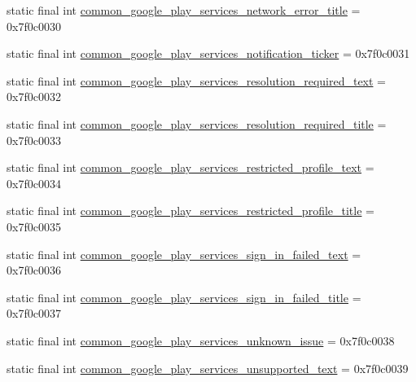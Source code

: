 \begin{DoxyCompactItemize}
static final int \mbox{\hyperlink{classcom_1_1google_1_1android_1_1gms_1_1R_1_1string_ae85e7451ff6dc49eb8c26d8fdca27ad6}{common\+\_\+google\+\_\+play\+\_\+services\+\_\+network\+\_\+error\+\_\+title}} = 0x7f0c0030
\item 
static final int \mbox{\hyperlink{classcom_1_1google_1_1android_1_1gms_1_1R_1_1string_a0ba938c0095c4d531fa326f3faf5dd84}{common\+\_\+google\+\_\+play\+\_\+services\+\_\+notification\+\_\+ticker}} = 0x7f0c0031
\item 
static final int \mbox{\hyperlink{classcom_1_1google_1_1android_1_1gms_1_1R_1_1string_a9a4d1c7d3a7d8f3f8477bdf1aff9f776}{common\+\_\+google\+\_\+play\+\_\+services\+\_\+resolution\+\_\+required\+\_\+text}} = 0x7f0c0032
\item 
static final int \mbox{\hyperlink{classcom_1_1google_1_1android_1_1gms_1_1R_1_1string_aa5b56a3886525cd5cef3815b8a86c771}{common\+\_\+google\+\_\+play\+\_\+services\+\_\+resolution\+\_\+required\+\_\+title}} = 0x7f0c0033
\item 
static final int \mbox{\hyperlink{classcom_1_1google_1_1android_1_1gms_1_1R_1_1string_a814d74e20831657403cf8264435d636c}{common\+\_\+google\+\_\+play\+\_\+services\+\_\+restricted\+\_\+profile\+\_\+text}} = 0x7f0c0034
\item 
static final int \mbox{\hyperlink{classcom_1_1google_1_1android_1_1gms_1_1R_1_1string_ab5ead667101eb6375ce2affa25bcb6e4}{common\+\_\+google\+\_\+play\+\_\+services\+\_\+restricted\+\_\+profile\+\_\+title}} = 0x7f0c0035
\item 
static final int \mbox{\hyperlink{classcom_1_1google_1_1android_1_1gms_1_1R_1_1string_a9b95b7055cdac31632502cdc539bba12}{common\+\_\+google\+\_\+play\+\_\+services\+\_\+sign\+\_\+in\+\_\+failed\+\_\+text}} = 0x7f0c0036
\item 
static final int \mbox{\hyperlink{classcom_1_1google_1_1android_1_1gms_1_1R_1_1string_af4c48404ef4585a8cccc4318e5e63178}{common\+\_\+google\+\_\+play\+\_\+services\+\_\+sign\+\_\+in\+\_\+failed\+\_\+title}} = 0x7f0c0037
\item 
static final int \mbox{\hyperlink{classcom_1_1google_1_1android_1_1gms_1_1R_1_1string_a39ffede1b6c3155a31aada088d01901b}{common\+\_\+google\+\_\+play\+\_\+services\+\_\+unknown\+\_\+issue}} = 0x7f0c0038
\item 
static final int \mbox{\hyperlink{classcom_1_1google_1_1android_1_1gms_1_1R_1_1string_a965e6ff944edf6d4ba6d756d87005b19}{common\+\_\+google\+\_\+play\+\_\+services\+\_\+unsupported\+\_\+text}} = 0x7f0c0039
\item 

\end{DoxyCompactItemize}
